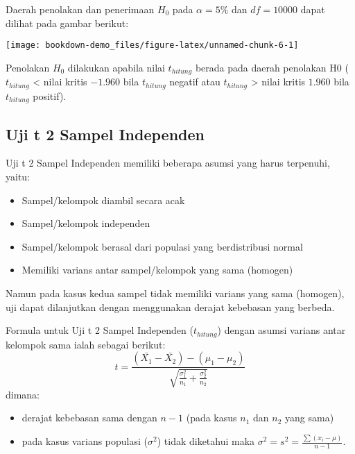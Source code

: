 \documentclass[
]{book}
\providecommand{\tightlist}{%
  \setlength{\itemsep}{0pt}\setlength{\parskip}{0pt}}
\begin{document}
Daerah penolakan dan penerimaan \(H_0\) pada \(\alpha = 5\%\) dan \(df = 10000\) dapat dilihat pada gambar berikut:

\begin{center}\texttt{[image: bookdown-demo\_files/figure-latex/unnamed-chunk-6-1]} \end{center}

Penolakan \(H_0\) dilakukan apabila nilai \(t_{hitung}\) berada pada daerah penolakan H0 (\(t_{hitung}\) \textless{} nilai kritis \(-1.960\) bila \(t_{hitung}\) negatif atau \(t_{hitung}\) \textgreater{} nilai kritis \(1.960\) bila \(t_{hitung}\) positif).

\hypertarget{uji-t-2-sampel-independen}{%
\subsection{Uji t 2 Sampel Independen}\label{uji-t-2-sampel-independen}}

Uji t 2 Sampel Independen memiliki beberapa asumsi yang harus terpenuhi, yaitu:

\begin{itemize}
\tightlist
\item
  Sampel/kelompok diambil secara acak
\item
  Sampel/kelompok independen
\item
  Sampel/kelompok berasal dari populasi yang berdistribusi normal
\item
  Memiliki varians antar sampel/kelompok yang sama (homogen)
\end{itemize}

Namun pada kasus kedua sampel tidak memiliki varians yang sama (homogen), uji dapat dilanjutkan dengan menggunakan derajat kebebasan yang berbeda.

Formula untuk Uji t 2 Sampel Independen (\(t_{hitung}\)) dengan asumsi varians antar kelompok sama ialah sebagai berikut:
\[
t = \frac{(\bar{X_1}-\bar{X_2})-(\mu_1-\mu_2)}{\sqrt{\frac{\sigma_1^2}{n_1}+\frac{\sigma_2^2}{n_2}}}
\]
dimana:

\begin{itemize}
\tightlist
\item
  derajat kebebasan sama dengan \(n-1\) (pada kasus \(n_1\) dan \(n_2\) yang sama)
\item
  pada kasus varians populasi (\(\sigma^2\)) tidak diketahui maka \(\sigma^2 = s^2 = \frac{\sum(x_i-\mu)}{n-1}\).
\end{itemize}
\end{document}
